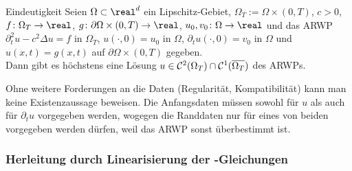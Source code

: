 \begin{Satz}{Eindeutigkeit}
    Seien $\Omega \subset \real^d$ ein Lipschitz-Gebiet, $\Omega_T := \Omega \times (0, T)$,
    $c > 0$, $f\colon \Omega_T \to \real$, $g\colon \partial\Omega \times (0, T) \to \real$,
    $u_0, v_0\colon \Omega \to \real$ und das ARWP
    $\partial_t^2 u - c^2 \Delta u = f$ in $\Omega_T$,
    $u(\cdot, 0) = u_0$ in $\Omega$,
    $\partial_t u(\cdot, 0) = v_0$ in $\Omega$ und
    $u(x, t) = g(x, t)$ auf $\partial\Omega \times (0, T)$ gegeben.\\
    Dann gibt es höchstens eine Lösung $u \in \mathcal{C}^2(\Omega_T) \cap \mathcal{C}^1(\overline{\Omega_T})$
    des ARWPs.
\end{Satz}

\begin{Bem}
    Ohne weitere Forderungen an die Daten (Regularität, Kompatibilität) kann man keine
    Existenzaussage beweisen.
    Die Anfangsdaten müssen sowohl für $u$ als auch für $\partial_t u$ vorgegeben werden,
    wogegen die Randdaten nur für eines von beiden vorgegeben werden dürfen,
    weil das ARWP sonst überbestimmt ist.
\end{Bem}

\pagebreak

\subsubsection{%
    Herleitung durch Linearisierung der -Gleichungen%
}

